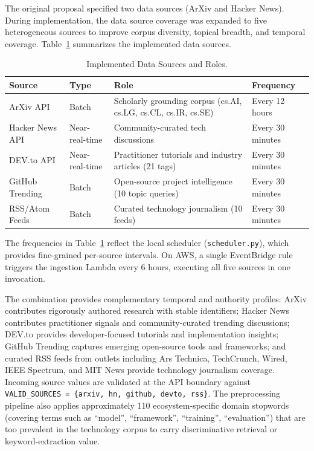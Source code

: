 The original proposal specified two data sources (ArXiv and Hacker News). During implementation, the data source coverage was expanded to five heterogeneous sources to improve corpus diversity, topical breadth, and temporal coverage. Table~\ref{tab:data_sources} summarizes the implemented data sources.

\begin{table}[H]
\caption{Implemented Data Sources and Roles.}
\label{tab:data_sources}
\centering
\begin{tabular}{p{3.0cm}p{2.5cm}p{4.5cm}p{2.5cm}}
\toprule
\textbf{Source} & \textbf{Type} & \textbf{Role} & \textbf{Frequency} \\
\midrule
ArXiv API & Batch & Scholarly grounding corpus (cs.AI, cs.LG, cs.CL, cs.IR, cs.SE) & Every 12 hours \\
Hacker News API & Near-real-time & Community-curated tech discussions & Every 30 minutes \\
DEV.to API & Near-real-time & Practitioner tutorials and industry articles (21 tags) & Every 30 minutes \\
GitHub Trending & Batch & Open-source project intelligence (10 topic queries) & Every 30 minutes \\
RSS/Atom Feeds & Batch & Curated technology journalism (10 feeds) & Every 30 minutes \\
\bottomrule
\end{tabular}
\end{table}

The frequencies in Table~\ref{tab:data_sources} reflect the local scheduler (\texttt{scheduler.py}), which provides fine-grained per-source intervals. On AWS, a single EventBridge rule triggers the ingestion Lambda every 6 hours, executing all five sources in one invocation.

The combination provides complementary temporal and authority profiles: ArXiv contributes rigorously authored research with stable identifiers; Hacker News contributes practitioner signals and community-curated trending discussions; DEV.to provides developer-focused tutorials and implementation insights; GitHub Trending captures emerging open-source tools and frameworks; and curated RSS feeds from outlets including Ars Technica, TechCrunch, Wired, IEEE Spectrum, and MIT News provide technology journalism coverage. Incoming source values are validated at the API boundary against \texttt{VALID\_SOURCES = \{arxiv, hn, github, devto, rss\}}. The preprocessing pipeline also applies approximately 110 ecosystem-specific domain stopwords (covering terms such as ``model'', ``framework'', ``training'', ``evaluation'') that are too prevalent in the technology corpus to carry discriminative retrieval or keyword-extraction value.

